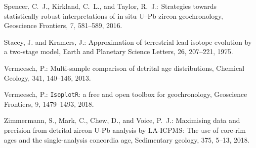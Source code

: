 \documentclass{article}
\begin{document}
\begin{thebibliography}{14}
Spencer, C.~J., Kirkland, C.~L., and Taylor, R.~J.: {Strategies towards
  statistically robust interpretations of in situ U--Pb zircon geochronology},
  Geoscience Frontiers, 7, 581--589, 2016.

Stacey, J. and Kramers, J.: Approximation of terrestrial lead isotope evolution
  by a two-stage model, Earth and Planetary Science Letters, 26, 207--221,
  1975.

Vermeesch, P.: Multi-sample comparison of detrital age distributions, Chemical
  Geology, 341, 140--146, 2013.

Vermeesch, P.: {\texttt{IsoplotR}: a free and open toolbox for geochronology},
  Geoscience Frontiers, 9, 1479--1493, 2018.

Zimmermann, S., Mark, C., Chew, D., and Voice, P.~J.: {Maximising data and
  precision from detrital zircon U-Pb analysis by LA-ICPMS: The use of core-rim
  ages and the single-analysis concordia age}, Sedimentary geology, 375, 5--13,
  2018.

\end{thebibliography}
\end{document}
